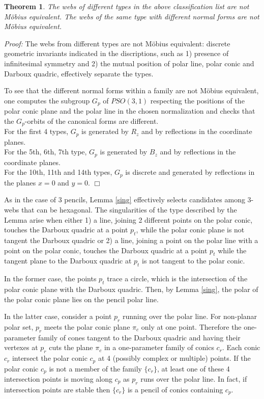 \documentclass[11pt,a4paper]{article}
\newtheorem{theorem}{Theorem}
\begin{document}
\begin{theorem}
The webs of different types in the above classification list are not Möbius equivalent. The webs of the same type with different normal forms are not Möbius equivalent.
\end{theorem}
{\it Proof:} The webs from different types are not Möbius equivalent: discrete geometric invariants indicated in the discriptions, such as 1) presence of infinitesimal symmetry and 2) the mutual position of polar line, polar conic and Darboux quadric, effectively separate the types. 

To see that the different normal forms within a family are not Möbius equivalent, one computes the  subgroup $G_p$ of $PSO(3,1)$  respecting the positions of the polar conic plane and the polar line in the chosen normalization and checks that  the $G_p$-orbits of the canonical forms are different.\\  
For the first 4 types, $G_p$ is generated by $R_z$ and by reflections in the coordinate planes. \\
For the 5th, 6th, 7th type,  $G_p$ is generated by $B_z$ and by reflections in the coordinate planes. \\
For the 10th, 11th and 14th types,  $G_p$ is discrete and generated by reflections in the planes $x=0$ and $y=0$.
  \hfill $\Box$
  
\medskip
As in the case of 3 pencils, Lemma \ref{sing} effectively selects candidates among 3-webs that can be hexagonal. The singularities of the type described by the Lemma arise when either 1)  a line, joining 2 different points on the polar conic, touches  the Darboux quadric at a point $p_t$, while  the polar conic plane is not tangent the Darboux quadric  or 2) a line, joining a point on the polar line  with a point on the polar conic, touches the Darboux quadric at a point $p_t$ while the tangent plane to the Darboux quadric at $p_t$ is not tangent to the polar conic.   

In the former case, the points $p_t$ trace a circle, which is the intersection of the polar conic plane with the Darboux quadric. Then, by Lemma \ref{sing}, the polar  of the polar conic plane lies on the pencil polar line.  

In the latter case, consider a point $p_r$ running over the polar line. For non-planar polar set, $p_r$ meets the polar conic plane $\pi_c$ only at one point. Therefore the one-parameter family of cones tangent to the  Darboux quadric and having their vertexes  at  $p_r$ cuts the plane $\pi_c$ in  a one-parameter family of conics $c_r$. Each conic $c_r$ intersect the polar conic $c_p$ at 4 (possibly complex or multiple) points. If the polar conic $c_p$ is not a member of the family $\{c_r\}$, at least one of these 4 intersection points is moving along $c_p$ as $p_r$ runs over the polar line. In fact, if intersection points are stable then $\{c_r\}$ is a pencil of conics containing $c_p$. 
\end{document}

